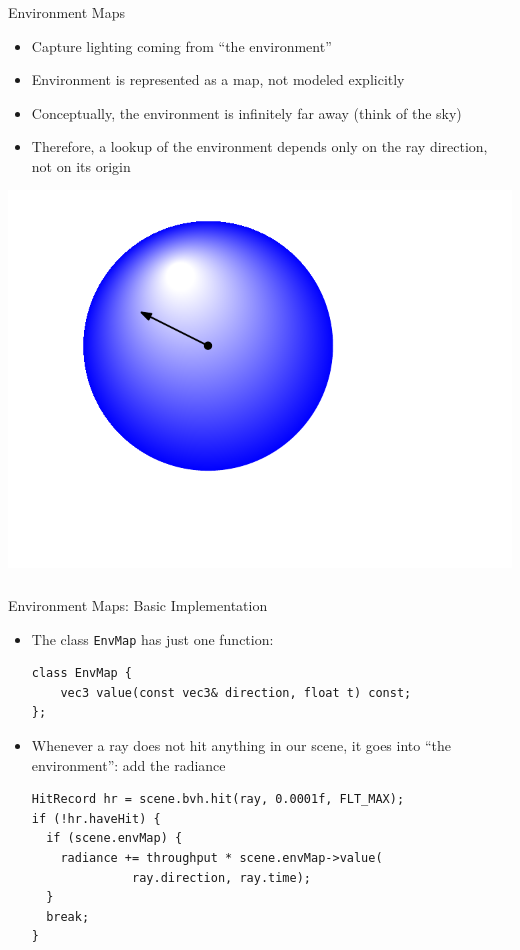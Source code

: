 \documentclass[utf8,stillsansserifmath,fleqn,t]{beamer}
\newcommand{\code}[1]{\texttt{#1}}
\begin{document}
\begin{frame}[label=envmap-1]
\frametitle{\insertsection}
Environment Maps
\begin{itemize}
\item Capture lighting coming from ``the environment''
\item Environment is represented as a map, not modeled explicitly
\item Conceptually, the environment is infinitely far away (think of the sky)
\item Therefore, a lookup of the environment depends only on
the ray direction, not on its origin
\end{itemize}
\centerline{\includegraphics[width=.35\textwidth]{./fig/envmap-principle.pdf}}
\end{frame}

\begin{frame}[fragile]
\frametitle{\insertsection}
Environment Maps: Basic Implementation
\begin{itemize}
\item The class \code{EnvMap} has just one function:
\begin{lstlisting}
class EnvMap {
    vec3 value(const vec3& direction, float t) const;
};
\end{lstlisting}
\item Whenever a ray does not hit anything in our scene, it goes into ``the
environment'': add the radiance
\begin{lstlisting}
HitRecord hr = scene.bvh.hit(ray, 0.0001f, FLT_MAX);
if (!hr.haveHit) {
  if (scene.envMap) {
    radiance += throughput * scene.envMap->value(
              ray.direction, ray.time);
  }
  break;
}
\end{lstlisting}
\end{itemize}
\end{frame}
\end{document}
